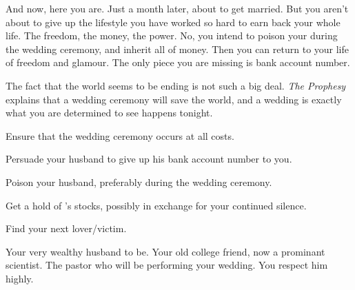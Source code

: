 \documentclass[char]{guildcamp1}
\begin{document}
And now, here you are. Just a month later, about to get married. But you aren't about to give up the lifestyle you have worked so hard to earn back your whole life. The freedom, the money, the power. No, you intend to poison your \cGroomA{\spouse} during the wedding ceremony, and inherit all of \cGroomA{\their} money. Then you can return to your life of freedom and glamour.  The only piece you are missing is \cGroomA{\their} bank account number. 

The fact that the world seems to be ending is not such a big deal. {\em The Prophesy} explains that a wedding ceremony will save the world, and a wedding is exactly what you are determined to see happens tonight.

\begin{itemz}[Goals]
  \item Ensure that the wedding ceremony occurs at all costs.
  \item Persuade your husband to give up his bank account number to you.
  \item Poison your husband, preferably during the wedding ceremony.
  \item Get a hold of \cRival{}'s stocks, possibly in exchange for your continued silence.
  \item Find your next lover/victim.
\end{itemz}

\begin{contacts}
  \contact{\cGroomA{}} Your very wealthy husband to be. 
  \contact{\cRival{}} Your old college friend, now a prominant scientist.
  \contact{\cPastor{}} The pastor who will be performing your wedding. You respect him highly.
  \end{contacts}
\end{document}
